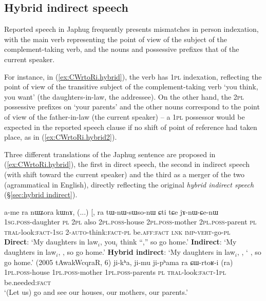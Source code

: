   
\subsection{Hybrid indirect speech} \label{sec:hybrid.intro}
Reported speech in Japhug frequently presents mismatches in person indexation, with the main verb representing the point of view of the subject of the complement-taking verb, and the nouns and possessive prefixes that of the current speaker.
 
For instance, in (\ref{ex:CWrtoRi.hybrid}), the verb  has \textsc{1pl} indexation, reflecting the point of view of the transitive subject of the complement-taking verb  `you think, you want' (the daughters-in-law, the addressee). On the other hand, the \textsc{2pl} possessive prefixes on  `your parents' and the other nouns correspond to the point of view of the father-in-law (the current speaker) -- a \textsc{1pl} possessor would be expected in the reported speech clause if no shift of point of reference had taken place, as in  (\ref{ex:CWrtoRi.hybrid2}).

Three different translations of the Japhug sentence are proposed in (\ref{ex:CWrtoRi.hybrid}), the first in direct speech, the second in indirect speech (with shift toward the current speaker) and the third as a merger of the two (agrammatical in English), directly reflecting the original \textit{hybrid indirect speech} (§\ref{sec:hybrid indirect}).

\begin{exe}
\ex 
\begin{xlist}
\ex \label{ex:CWrtoRi.hybrid}
\gll  a-me ra nɯʑora kɯnɤ, (...) [,   ra \bleu{ɕɯ-rtoʁ-i]} tɯ-nɯ-sɯso-nɯ ɕti tɕe jɤ-nɯ-ɕe-nɯ   \\
\textsc{1sg}.\textsc{poss}-daughter \textsc{pl} \textsc{2pl} also {  } \textsc{2pl}.\textsc{poss}-house \textsc{2pl}.\textsc{poss}-mother  \textsc{2pl}.\textsc{poss}-parent \textsc{pl} \textsc{tral}-look:\textsc{fact}-\textsc{1sg} 2-\textsc{auto}-think:\textsc{fact}-\textsc{pl} be.\textsc{aff}:\textsc{fact} \textsc{lnk} \textsc{imp}-\textsc{vert}-go-\textsc{pl} \\ 
\glt  \textbf{Direct}: `My daughters in law$_i$, you$_i$ think ``,'' so go home.' 
\glt  \textbf{Indirect}:   `My daughters in law$_i$, , so go home.'
\glt  \textbf{Hybrid indirect}: `My daughters in law$_i$, , ` , so go home.' (2005 tAwakWcqraR, 6)
\ex \label{ex:CWrtoRi.hybrid2}
\gll ji-kʰa, ji-mu ji-pʰama ra ɕɯ-rtoʁ-i (ra)\\
\textsc{1pl}.\textsc{poss}-house \textsc{1pl}.\textsc{poss}-mother \textsc{1pl}.\textsc{poss}-parents \textsc{pl} \textsc{tral}-look:\textsc{fact}-\textsc{1pl} be.needed:\textsc{fact} \\
\glt `(Let us) go and see our houses, our mothers, our parents.' 
\end{xlist}
\end{exe}

